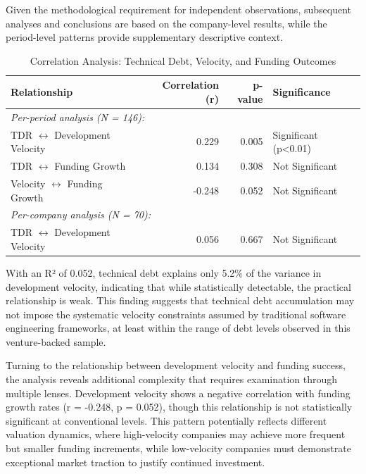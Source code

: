 Given the methodological requirement for independent observations, subsequent analyses and conclusions are based on the company-level results, while the period-level patterns provide supplementary descriptive context.

\begin{table}[htbp]
\centering
\caption{Correlation Analysis: Technical Debt, Velocity, and Funding Outcomes}
\label{tab:correlations}
\begin{tabular}{lrrl}
\hline
\textbf{Relationship} & \textbf{Correlation (r)} & \textbf{p-value} & \textbf{Significance} \\
\hline
\multicolumn{4}{l}{\textit{Per-period analysis (N = 146):}} \\
TDR $\leftrightarrow$ Development Velocity & 0.229 & 0.005 & Significant (p<0.01) \\
TDR $\leftrightarrow$ Funding Growth & 0.134 & 0.308 & Not Significant \\
Velocity $\leftrightarrow$ Funding Growth & -0.248 & 0.052 & Not Significant \\
\hline
\multicolumn{4}{l}{\textit{Per-company analysis (N = 70):}} \\
TDR $\leftrightarrow$ Development Velocity & 0.056 & 0.667 & Not Significant \\
\hline
\end{tabular}
\end{table}

With an R² of 0.052, technical debt explains only 5.2\% of the variance in development velocity, indicating that while statistically detectable, the practical relationship is weak. This finding suggests that technical debt accumulation may not impose the systematic velocity constraints assumed by traditional software engineering frameworks, at least within the range of debt levels observed in this venture-backed sample.

Turning to the relationship between development velocity and funding success, the analysis reveals additional complexity that requires examination through multiple lenses. Development velocity shows a negative correlation with funding growth rates (r = -0.248, p = 0.052), though this relationship is not statistically significant at conventional levels. This pattern potentially reflects different valuation dynamics, where high-velocity companies may achieve more frequent but smaller funding increments, while low-velocity companies must demonstrate exceptional market traction to justify continued investment.

